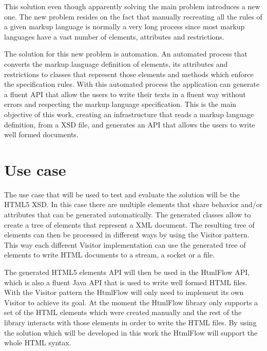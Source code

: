 \newpage

\noindent
This solution even though apparently solving the main problem introduces a new one. The new problem resides on the fact that manually recreating all the rules of a given markup language is normally a very long process since most markup languages have a vast number of elements, attributes and restrictions. 

\noindent
The solution for this new problem is automation. An automated process that converts the markup language definition of elements, its attributes and restrictions to classes that represent those elements and methods which enforce the specification rules. With this automated process the application can generate a fluent \ac{API} that allow the users to write their texts in a fluent way without errors and respecting the markup language specification. This is the main objective of this work, creating an infrastructure that reads a markup language definition, from a \ac{XSD} file, and generates an \ac{API} that allows the users to write well formed documents.

\section{Use case}
\label{sec:usecase}

The use case that will be used to test and evaluate the solution will be the \ac{HTML}5 \ac{XSD}. In this case there are multiple elements that share behavior and/or attributes that can be generated automatically. The generated classes allow to create a tree of elements that represent a \ac{XML} document. The resulting tree of elements can then be processed in different ways by using the Visitor pattern. This way each different Visitor implementation can use the generated tree of elements to write \ac{HTML} documents to a stream, a socket or a file. 

\noindent
The generated \ac{HTML}5 elements \ac{API} will then be used in the HtmlFlow \ac{API}, which is also a fluent Java \ac{API} that is used to write well formed \ac{HTML} files. With the Visitor pattern the HtmlFlow will only need to implement its own Visitor to achieve its goal. At the moment the HtmlFlow library only supports a set of the \ac{HTML} elements which were created manually and the rest of the library interacts with those elements in order to write the \ac{HTML} files. By using the solution which will be developed in this work the HtmlFlow will support the whole \ac{HTML} syntax. 
